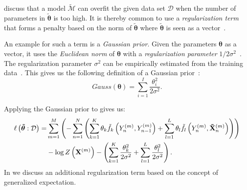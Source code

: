 \bigskip

\citet{sutton2010introduction} discuss that a model $\tilde{\mathcal{M}}$ can overfit the given data set $\mathcal{D}$ when the number of parameters in $\bm{\tilde{\theta}}$ is too high.
It is thereby common to use a \textit{regularization term} that forms a penalty based on the norm of $\bm{\tilde{\theta}}$ where $\bm{\tilde{\theta}}$ is seen as a vector~\citep{koller2009probabilistic,sutton2010introduction}.

An example for such a term is a \textit{Gaussian prior}.
Given the parameters $\bm{\theta}$ as a vector, it uses the \textit{Euclidean norm} of $\bm{\theta}$ with a \textit{regularization parameter} $1/2\sigma^2$~\citep{sutton2010introduction}.
The regularization parameter $\sigma^2$ can be empirically estimated from the training data~\citep{chen1999gaussian}.
This gives us the following definition of a Gaussian prior~\citep{sutton2010introduction}:
\begin{equation}
  \label{equ:gaussian-prior}
  Gauss(\bm{\theta})=\sum_{i=1}^I\frac{\theta_i^2}{2\sigma^2}.
\end{equation}

Applying the Gaussian prior to  gives us:
\begin{equation}
  \label{equ:log-likelihood-linear-chain-crf-log-linear-gaussian}
  \begin{split}
    \ell\left(\bm{\tilde{\theta}}:\mathcal{D}\right) = & \sum_{m=1}^M \left(-\sum_{n=1}^N \left(\sum_{k=1}^K\theta_k \tilde{f}_k\left(\vphantom{\tilde{X}}Y_n^{(m)},Y_{n-1}^{(m)}\right)+\sum_{l=1}^L\theta_l \tilde{f}_l\left(Y_n^{(m)},\mathbf{\tilde{X}}_n^{(m)}\right)\right)\right) \\
    & -\log Z\left(\mathbf{X}^{(m)}\right)-\left(\sum_{k=1}^K\frac{\theta_k^2}{2\sigma^2}+\sum_{l=1}^L\frac{\theta_l^2}{2\sigma^2}\right).
 \end{split}
\end{equation}
In  we discuss an additional regularization term based on the concept of \gls{generalized expectation}.

\bigskip

